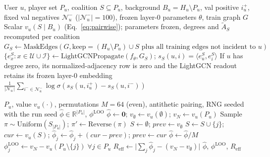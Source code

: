 \documentclass[pdflatex,sn-mathphys-num]{sn-jnl}
\begin{document}
\begin{algorithm}[t]
\caption{Validation-Only Coalition Value $v_u(S)$}\label{alg:value}
\begin{algorithmic}[1]
\Require User $u$, player set $P_u$, coalition $S\subseteq P_u$, background $B_u=H_u\setminus P_u$, val positive $i_u^+$, fixed val negatives $\mathcal{N}_u^-$ ($|\mathcal{N}_u^-|=100$), frozen layer-0 parameters $\theta$, train graph $G$
\Ensure Scalar $v_u(S\mid B_u)$ (Eq.~\ref{eq:pairwise}); parameters frozen, degrees and $\tilde A_S$ recomputed per coalition
\State $G_S\gets \text{MaskEdges}(G,\text{keep}=(H_u\setminus P_u)\cup S\text{ plus all training edges not incident to }u)$ 
\State $\{e_x^S:x\in\mathcal{U}\cup\mathcal{I}\}\gets \text{LightGCNPropagate}(f_\theta,G_S)$; $s_S(u,i)=\langle e_u^S,e_i^S\rangle$
\State If $u$ has degree zero, its normalized-adjacency row is zero and the LightGCN readout retains its frozen layer-0 embedding
\State \Return $\frac{1}{|\mathcal{N}_u^-|}\sum_{i^-\in\mathcal{N}_u^-}\log\sigma(s_S(u,i_u^+)-s_S(u,i^-))$
\end{algorithmic}
\end{algorithm}

\begin{algorithm}[t]
\caption{Antithetic MC Shapley and LOO Marginal}\label{alg:shapley}
\begin{algorithmic}[1]
\Require $P_u$, value $v_u(\cdot)$, permutations $M=64$ (even), antithetic pairing, RNG seeded with the run seed
\Ensure $\hat\phi\in\mathbb{R}^{|P_u|}$, $\phi^{\text{LOO}}$
\State $\hat\phi\gets \mathbf{0}$; $v_\emptyset\gets v_u(\emptyset)$; $v_N\gets v_u(P_u)$
  \State Sample $\pi\sim\text{Uniform}(S_{|P_u|})$; $\pi'\gets\text{Reverse}(\pi)$ 
    \State $S\gets\emptyset$; $prev\gets v_\emptyset$
      \State $S\gets S\cup\{j\}$; $cur\gets v_u(S)$; $\hat\phi_j\gets\hat\phi_j+(cur-prev)$; $prev\gets cur$
    \EndFor
  \EndFor
\EndFor
\State $\hat\phi\gets\hat\phi/M$
\State $\phi^{\text{LOO}}_j\gets v_N-v_u(P_u\setminus\{j\})\;\forall j\in P_u$
\State $R_{\text{eff}}\gets\bigl|\sum_j\hat\phi_j-(v_N-v_\emptyset)\bigr|$ 
\State \Return $\hat\phi$, $\phi^{\text{LOO}}$, $R_{\text{eff}}$
\end{algorithmic}
\end{algorithm}
\end{document}
